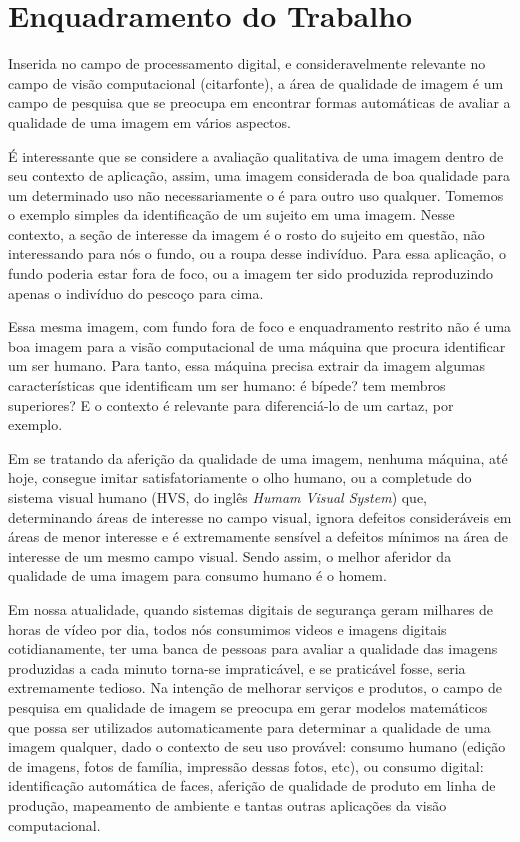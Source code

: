 \documentclass[a4paper]{book}
\begin{document}


	\section{Enquadramento do Trabalho}
	Inserida no campo de processamento digital, e consideravelmente relevante no campo de visão computacional (citarfonte), a área de qualidade de imagem é um campo de pesquisa que se preocupa em encontrar formas automáticas de avaliar a qualidade de uma imagem em vários aspectos.

	É interessante que se considere a avaliação qualitativa de uma imagem dentro de seu contexto de aplicação, assim, uma imagem considerada de boa qualidade para um determinado uso não necessariamente o é para outro uso qualquer. Tomemos o exemplo simples da identificação de um sujeito em uma imagem. Nesse contexto, a seção de interesse da imagem é o rosto do sujeito em questão, não interessando para nós o fundo, ou a roupa desse indivíduo. Para essa aplicação, o fundo poderia estar fora de foco, ou a imagem ter sido produzida reproduzindo apenas o indivíduo do pescoço para cima.

	Essa mesma imagem, com fundo fora de foco e enquadramento restrito não é uma boa imagem para a visão computacional de uma máquina que procura identificar um ser humano. Para tanto, essa máquina precisa extrair da imagem algumas características que identificam um ser humano: é bípede? tem membros superiores? E o contexto é relevante para diferenciá-lo de um cartaz, por exemplo.

	Em se tratando da aferição da qualidade de uma imagem, nenhuma máquina, até hoje, consegue imitar satisfatoriamente o olho humano, ou a completude do sistema visual humano (HVS, do inglês {\em Humam Visual System}) que, determinando áreas de interesse no campo visual, ignora defeitos consideráveis em áreas de menor interesse e é extremamente sensível a defeitos mínimos na área de interesse de um mesmo campo visual. Sendo assim, o melhor aferidor da qualidade de uma imagem para consumo humano é o homem.

	Em nossa atualidade, quando sistemas digitais de segurança geram milhares de horas de vídeo por dia, todos nós consumimos videos e imagens digitais cotidianamente, ter uma banca de pessoas para avaliar a qualidade das imagens produzidas a cada minuto torna-se impraticável, e se praticável fosse, seria extremamente tedioso. Na intenção de melhorar serviços e produtos, o campo de pesquisa em qualidade de imagem se preocupa em gerar modelos matemáticos que possa ser utilizados automaticamente para determinar a qualidade de uma imagem qualquer, dado o contexto de seu uso provável: consumo humano (edição de imagens, fotos de família, impressão dessas fotos, etc), ou consumo digital: identificação automática de faces, aferição de qualidade de produto em linha de produção, mapeamento de ambiente e tantas outras aplicações da visão computacional.
\end{document}
